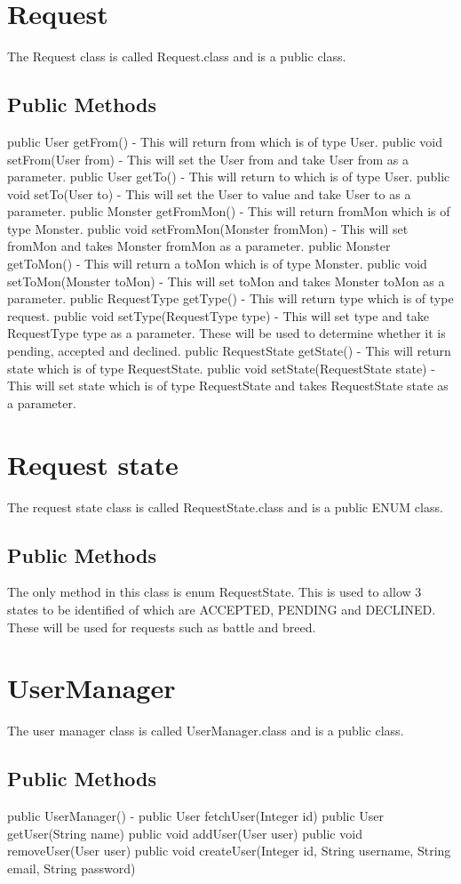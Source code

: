 \documentclass{project}
\begin{document}
\section{Request}
The Request class is called Request.class and is a public class.
\subsection{Public Methods}
public User getFrom() - This will return from which is of type User. public void setFrom(User from) - This will set the User from and take User from as a parameter.
public User getTo() - This will return to which is of type User. public void setTo(User to) - This will set the User to value and take User to as a parameter.
public Monster getFromMon() - This will return fromMon which is of type Monster. public void setFromMon(Monster fromMon) - This will set fromMon and takes Monster fromMon as a parameter.
public Monster getToMon() - This will return a toMon which is of type Monster. public void setToMon(Monster toMon) - This will set toMon and takes Monster toMon as a parameter.
public RequestType getType() - This will return type which is of type request. public void setType(RequestType type) - This will set type and take RequestType type as a parameter. These will be used to determine whether it is pending, accepted and declined.
public RequestState getState() - This will return state which is of type RequestState. public void setState(RequestState state) - This will set state which is of type RequestState and takes RequestState state as a parameter.

\section{Request state}
The request state class is called RequestState.class and is a public ENUM class.
\subsection{Public Methods}
The only method in this class is enum RequestState. This is used to allow 3 states to be identified of which are ACCEPTED, PENDING and DECLINED. These will be used for requests such as battle and breed.

\section{UserManager}
The user manager class is called UserManager.class and is a public class.
\subsection{Public Methods}
public UserManager() - 
public User fetchUser(Integer id)
public User getUser(String name)
public void addUser(User user)
public void removeUser(User user)
public void createUser(Integer id, String username, String email, String password)
\end{document}
